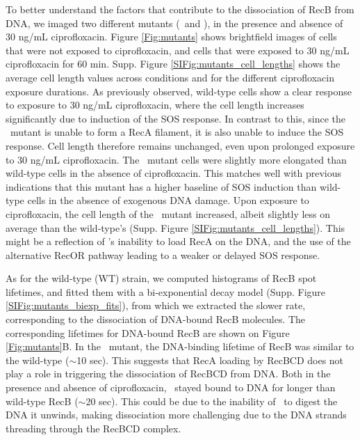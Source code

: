 To better understand the factors that contribute to the dissociation of RecB from DNA, we imaged two different mutants (\dreca\ and \teneighty), in the presence and absence of 30 ng/mL ciprofloxacin. Figure \ref{Fig:mutants} shows brightfield images of cells that were not exposed to ciprofloxacin, and cells that were exposed to 30 ng/mL ciprofloxacin for 60 min. Supp. Figure \ref{SIFig:mutants_cell_lengths} shows the average cell length values across conditions and for the different ciprofloxacin exposure durations. As previously observed, wild-type cells show a clear response to exposure to 30 ng/mL ciprofloxacin, where the cell length increases significantly due to induction of the SOS response. In contrast to this, since the \dreca\ mutant is unable to form a RecA filament, it is also unable to induce the SOS response. Cell length therefore remains unchanged, even upon prolonged exposure to 30 ng/mL ciprofloxacin. The \teneighty\ mutant cells were slightly more elongated than wild-type cells in the absence of ciprofloxacin. This matches well with previous indications that this mutant has a higher baseline of SOS induction than wild-type cells in the absence of exogenous DNA damage.\cite{Lepore2023} Upon exposure to ciprofloxacin, the cell length of the \teneighty\ mutant increased, albeit slightly less on average than the wild-type's (Supp. Figure \ref{SIFig:mutants_cell_lengths}). This might be a reflection of \teneighty's inability to load RecA on the DNA, and the use of the alternative RecOR pathway leading to a weaker or delayed SOS response.

As for the wild-type (WT) strain, we computed histograms of RecB spot lifetimes, and fitted them with a bi-exponential decay model (Supp. Figure \ref{SIFig:mutants_biexp_fits}), from which we extracted the slower rate, corresponding to the dissociation of DNA-bound RecB molecules. The corresponding lifetimes for DNA-bound RecB are shown on Figure \ref{Fig:mutants}B. In the \dreca\ mutant, the DNA-binding lifetime of RecB was similar to the wild-type ($\sim$10 sec). This suggests that RecA loading by RecBCD does not play a role in triggering the dissociation of RecBCD from DNA. Both in the presence and absence of ciprofloxacin, \teneighty\ stayed bound to DNA for longer than wild-type RecB ($\sim$20 sec). This could be due to the inability of \teneighty\ to digest the DNA it unwinds, making dissociation more challenging due to the DNA strands threading through the RecBCD complex.

